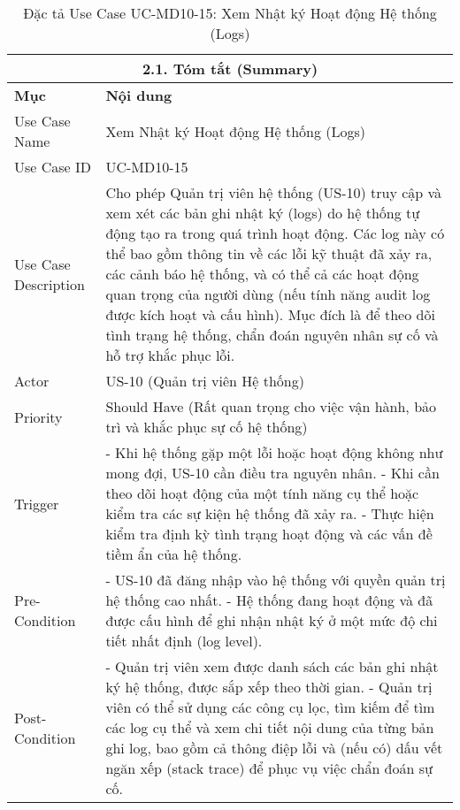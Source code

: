 \begin{longtable}{|m{4cm}|p{11cm}|}
\caption{Đặc tả Use Case UC-MD10-15: Xem Nhật ký Hoạt động Hệ thống (Logs)} \label{tab:uc_md10_15_full_v2_latex_fixed_in_codeblock} \\
\hline
\multicolumn{2}{|c|}{\textbf{2.1. Tóm tắt (Summary)}} \\
\hline
\textbf{Mục} & \textbf{Nội dung} \\
\hline
\endhead %
\midrule
\endfoot %
\bottomrule
\endlastfoot %
Use Case Name & Xem Nhật ký Hoạt động Hệ thống (Logs) \\
\hline
Use Case ID & UC-MD10-15 \\
\hline
Use Case Description & Cho phép Quản trị viên hệ thống (US-10) truy cập và xem xét các bản ghi nhật ký (logs) do hệ thống tự động tạo ra trong quá trình hoạt động. Các log này có thể bao gồm thông tin về các lỗi kỹ thuật đã xảy ra, các cảnh báo hệ thống, và có thể cả các hoạt động quan trọng của người dùng (nếu tính năng audit log được kích hoạt và cấu hình). Mục đích là để theo dõi tình trạng hệ thống, chẩn đoán nguyên nhân sự cố và hỗ trợ khắc phục lỗi. \\
\hline
Actor & US-10 (Quản trị viên Hệ thống) \\
\hline
Priority & Should Have (Rất quan trọng cho việc vận hành, bảo trì và khắc phục sự cố hệ thống) \\
\hline
Trigger & - Khi hệ thống gặp một lỗi hoặc hoạt động không như mong đợi, US-10 cần điều tra nguyên nhân. \newline - Khi cần theo dõi hoạt động của một tính năng cụ thể hoặc kiểm tra các sự kiện hệ thống đã xảy ra. \newline - Thực hiện kiểm tra định kỳ tình trạng hoạt động và các vấn đề tiềm ẩn của hệ thống. \\
\hline
Pre-Condition & - US-10 đã đăng nhập vào hệ thống với quyền quản trị hệ thống cao nhất. \newline - Hệ thống đang hoạt động và đã được cấu hình để ghi nhận nhật ký ở một mức độ chi tiết nhất định (log level). \\
\hline
Post-Condition & - Quản trị viên xem được danh sách các bản ghi nhật ký hệ thống, được sắp xếp theo thời gian. \newline - Quản trị viên có thể sử dụng các công cụ lọc, tìm kiếm để tìm các log cụ thể và xem chi tiết nội dung của từng bản ghi log, bao gồm cả thông điệp lỗi và (nếu có) dấu vết ngăn xếp (stack trace) để phục vụ việc chẩn đoán sự cố. \\

\end{longtable}
